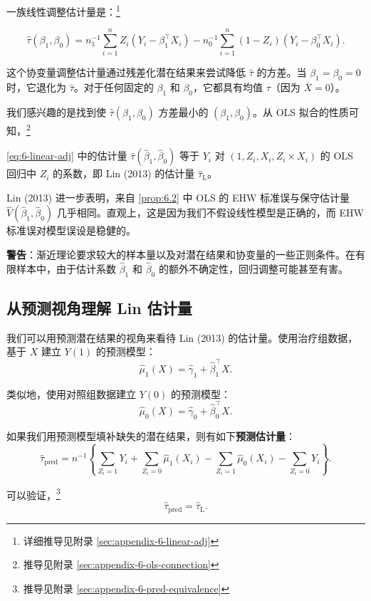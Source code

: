 一族线性调整估计量是：\footnote{详细推导见附录 \cref{sec:appendix-6-linear-adj}}

\[
\hat{\tau}(\beta_1, \beta_0) = n_1^{-1}\sum_{i=1}^n Z_i (Y_i - \beta_1^\top X_i) - n_0^{-1}\sum_{i=1}^n (1-Z_i)(Y_i - \beta_0^\top X_i) .
\label{eq:6-linear-adj}
\]

这个协变量调整估计量通过残差化潜在结果来尝试降低 $\hat{\tau}$ 的方差。当 $\beta_1 = \beta_0 = 0$ 时，它退化为 $\hat{\tau}$。对于任何固定的 $\beta_1$ 和 $\beta_0$，它都具有均值 $\tau$（因为 $\bar{X} = 0$）。

我们感兴趣的是找到使 $\hat{\tau}(\beta_1, \beta_0)$ 方差最小的 $(\beta_1, \beta_0)$。从 OLS 拟合的性质可知，\footnote{推导见附录 \cref{sec:appendix-6-ols-connection}}

\begin{Proposition}\label{prop:6.2}
\cref{eq:6-linear-adj} 中的估计量 $\hat{\tau}(\hat{\beta}_1, \hat{\beta}_0)$ 等于 $Y_i$ 对 $(1, Z_i, X_i, Z_i \times X_i)$ 的 OLS 回归中 $Z_i$ 的系数，即 Lin (2013) 的估计量 $\hat{\tau}_{\mathrm{L}}$。
\end{Proposition}

Lin (2013) 进一步表明，来自 \cref{prop:6.2} 中 OLS 的 EHW 标准误与保守估计量 $\hat{V}(\hat{\beta}_1, \hat{\beta}_0)$ 几乎相同。直观上，这是因为我们不假设线性模型是正确的，而 EHW 标准误对模型误设是稳健的。

\textbf{警告}：渐近理论要求较大的样本量以及对潜在结果和协变量的一些正则条件。在有限样本中，由于估计系数 $\hat{\beta}_1$ 和 $\hat{\beta}_0$ 的额外不确定性，回归调整可能甚至有害。

\subsection{从预测视角理解 Lin 估计量}\label{sec:6-prediction-view}

我们可以用预测潜在结果的视角来看待 Lin (2013) 的估计量。使用治疗组数据，基于 $X$ 建立 $Y(1)$ 的预测模型：
\[
\hat{\mu}_1(X) = \hat{\gamma}_1 + \hat{\beta}_1^\top X .
\]

类似地，使用对照组数据建立 $Y(0)$ 的预测模型：
\[
\hat{\mu}_0(X) = \hat{\gamma}_0 + \hat{\beta}_0^\top X .
\]

如果我们用预测模型填补缺失的潜在结果，则有如下\textbf{预测估计量}：
\[
\hat{\tau}_{\text{pred}} = n^{-1}\left\{ \sum_{Z_i=1} Y_i + \sum_{Z_i=0} \hat{\mu}_1(X_i) - \sum_{Z_i=1} \hat{\mu}_0(X_i) - \sum_{Z_i=0} Y_i \right\} .
\]

可以验证，\footnote{推导见附录 \cref{sec:appendix-6-pred-equivalence}}
\[
\hat{\tau}_{\text{pred}} = \hat{\tau}_{\mathrm{L}} .
\]

